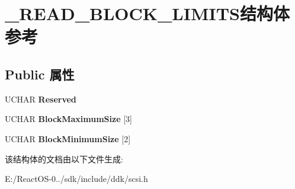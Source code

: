 \hypertarget{struct___r_e_a_d___b_l_o_c_k___l_i_m_i_t_s}{}\section{\+\_\+\+R\+E\+A\+D\+\_\+\+B\+L\+O\+C\+K\+\_\+\+L\+I\+M\+I\+T\+S结构体 参考}
\label{struct___r_e_a_d___b_l_o_c_k___l_i_m_i_t_s}
\subsection*{Public 属性}
\begin{DoxyCompactItemize}
\item 
\mbox{\label{struct___r_e_a_d___b_l_o_c_k___l_i_m_i_t_s_ac43fb0b7388ad64aa1a1ac9d95fe4771}} 
U\+C\+H\+AR {\bfseries Reserved}
\item 
\mbox{\label{struct___r_e_a_d___b_l_o_c_k___l_i_m_i_t_s_a638e4a041afb507aa3bfea0adc5d038b}} 
U\+C\+H\+AR {\bfseries Block\+Maximum\+Size} \mbox{[}3\mbox{]}
\item 
\mbox{\label{struct___r_e_a_d___b_l_o_c_k___l_i_m_i_t_s_a05b5f200d5e2d8e2bb03cdeca2a49420}} 
U\+C\+H\+AR {\bfseries Block\+Minimum\+Size} \mbox{[}2\mbox{]}
\end{DoxyCompactItemize}


该结构体的文档由以下文件生成\+:\begin{DoxyCompactItemize}
\item 
E\+:/\+React\+O\+S-\/0../sdk/include/ddk/scsi.\+h\end{DoxyCompactItemize}
